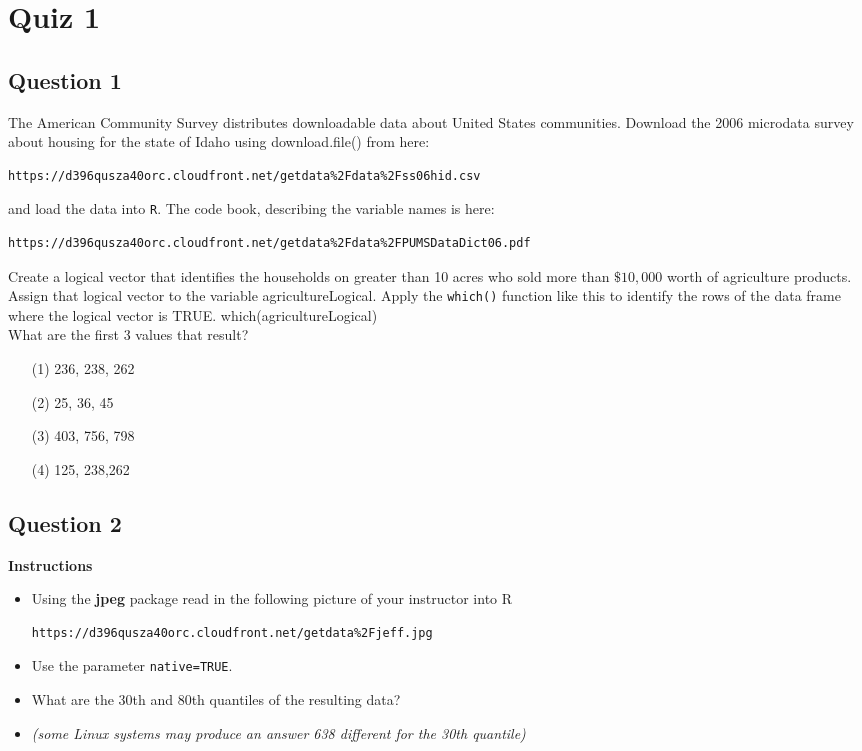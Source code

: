\documentclass[]{article}
\begin{document}
\section{Quiz 1}
\subsection*{Question 1}
The American Community Survey distributes downloadable data about United States communities. Download the 2006 microdata survey about housing for the state of Idaho using download.file() from here: 
\begin{verbatim}
https://d396qusza40orc.cloudfront.net/getdata%2Fdata%2Fss06hid.csv 
\end{verbatim}
and load the data into \texttt{R}. The code book, describing the variable names is here: 
\begin{verbatim}
https://d396qusza40orc.cloudfront.net/getdata%2Fdata%2FPUMSDataDict06.pdf 
\end{verbatim}

\noindent Create a logical vector that identifies the households on greater than 10 acres who sold more than $\$10,000$ worth of agriculture products. 
\\
Assign that logical vector to the variable agricultureLogical. Apply the \texttt{which()} function like this to identify the rows of the data frame where the logical vector is TRUE. which(agricultureLogical) 
\\
What are the first 3 values that result?
\begin{itemize}
\item[(1)] 236, 238, 262
\item[(2)] 25, 36, 45
\item[(3)] 403, 756, 798
\item[(4)] 125, 238,262
\end{itemize}
\newpage
\subsection*{Question 2}
\textbf{Instructions}
\begin{itemize}
\item Using the \textbf{jpeg} package read in the following picture of your instructor into R 

\begin{verbatim}
https://d396qusza40orc.cloudfront.net/getdata%2Fjeff.jpg 
\end{verbatim}

\item Use the parameter \texttt{native=TRUE}. 
\item What are the 30th and 80th quantiles of the resulting data? 

\item \textit{(some Linux systems may produce an answer 638 different for the 30th quantile)}
\end{itemize}
\end{document}
